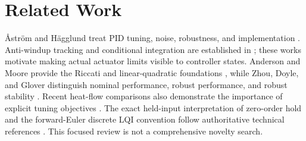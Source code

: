 \section{Related Work}
{\AA}str\"om and H\"agglund treat PID tuning, noise, robustness, and implementation \cite{astrom2006}. Anti-windup tracking and conditional integration are established in \cite{astrom1989,rundqwist1990}; these works motivate making actual actuator limits visible to controller states. Anderson and Moore provide the Riccati and linear-quadratic foundations \cite{anderson1990}, while Zhou, Doyle, and Glover distinguish nominal performance, robust performance, and robust stability \cite{zhou1996}. Recent heat-flow comparisons also demonstrate the importance of explicit tuning objectives \cite{teppa2025}. The exact held-input interpretation of zero-order hold and the forward-Euler discrete LQI convention follow authoritative technical references \cite{mathworks_zoh,mathworks_lqi}. This focused review is not a comprehensive novelty search.
